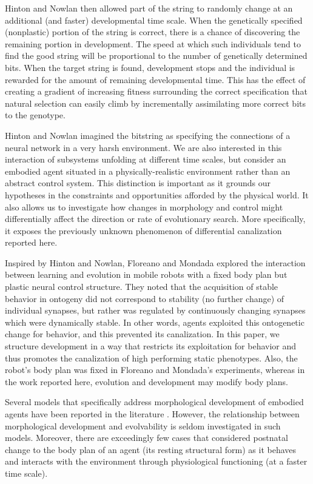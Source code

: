 Hinton and Nowlan then allowed part of the string to randomly change at an additional (and faster) developmental time scale.
When the genetically specified (nonplastic) portion of the string is correct, there is a chance of discovering the remaining portion in development.	
The speed at which such individuals tend to find the good string will be proportional to the number of genetically determined bits.
When the target string is found, development stops and the individual is rewarded for the amount of remaining developmental time.
This has the effect of creating a gradient of increasing fitness surrounding the correct specification that natural selection can easily climb by incrementally assimilating more correct bits to the genotype.


Hinton and Nowlan imagined the bitstring as specifying the connections of a neural network in a very harsh environment.
We are also interested in this interaction of subsystems unfolding at different time scales, but consider an embodied agent situated in a physically-realistic environment rather than an abstract control system.
This distinction is important as it grounds our hypotheses in the constraints and opportunities afforded by the physical world.
It also allows us to investigate how changes in morphology and control might differentially affect the direction or rate of evolutionary search.
More specifically, it exposes the previously unknown phenomenon of differential canalization reported here.

Inspired by Hinton and Nowlan, Floreano and Mondada \cite{floreano1996plastic} explored the interaction between learning and evolution in mobile robots with a fixed body plan but plastic neural control structure.
They noted that the acquisition of stable behavior in ontogeny did not correspond to stability (no further change) of individual synapses, but rather was regulated by continuously changing synapses which were dynamically stable.
In other words, agents exploited this ontogenetic change for behavior, and this prevented its canalization.
In this paper, we structure development in a way that restricts its exploitation for behavior and thus promotes the canalization of high performing static phenotypes.
Also, the robot's body plan was fixed in Floreano and Mondada's experiments\cite{floreano1996plastic}, whereas in the work reported here, evolution and development may modify body plans.


Several models that specifically address morphological development of embodied agents have been reported in the literature
\cite{dellaert1996developmental,eggenberger1997evolving,Bongard01,miller2004evolving,doursat2009organically}.
However, the relationship between morphological development and evolvability is seldom investigated in such models.
Moreover, there are exceedingly few cases that considered postnatal change to the body plan of an agent (its resting structural form) as it behaves and interacts with the environment through physiological functioning (at a faster time scale).


